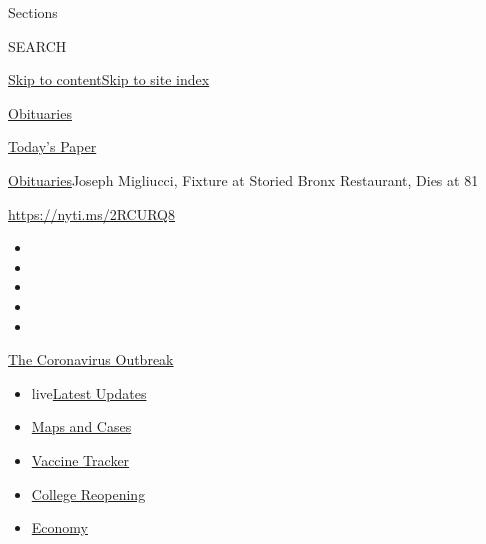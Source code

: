 Sections

SEARCH

\protect\hyperlink{site-content}{Skip to
content}\protect\hyperlink{site-index}{Skip to site index}

\href{https://www.nytimes3xbfgragh.onion/section/obituaries}{Obituaries}

\href{https://myaccount.nytimes3xbfgragh.onion/auth/login?response_type=cookie\&client_id=vi}{}

\href{https://www.nytimes3xbfgragh.onion/section/todayspaper}{Today's
Paper}

\href{/section/obituaries}{Obituaries}\textbar{}Joseph Migliucci,
Fixture at Storied Bronx Restaurant, Dies at 81

\url{https://nyti.ms/2RCURQ8}

\begin{itemize}
\item
\item
\item
\item
\item
\end{itemize}

\href{https://www.nytimes3xbfgragh.onion/news-event/coronavirus?action=click\&pgtype=Article\&state=default\&region=TOP_BANNER\&context=storylines_menu}{The
Coronavirus Outbreak}

\begin{itemize}
\tightlist
\item
  live\href{https://www.nytimes3xbfgragh.onion/2020/08/04/world/coronavirus-covid-19.html?action=click\&pgtype=Article\&state=default\&region=TOP_BANNER\&context=storylines_menu}{Latest
  Updates}
\item
  \href{https://www.nytimes3xbfgragh.onion/interactive/2020/us/coronavirus-us-cases.html?action=click\&pgtype=Article\&state=default\&region=TOP_BANNER\&context=storylines_menu}{Maps
  and Cases}
\item
  \href{https://www.nytimes3xbfgragh.onion/interactive/2020/science/coronavirus-vaccine-tracker.html?action=click\&pgtype=Article\&state=default\&region=TOP_BANNER\&context=storylines_menu}{Vaccine
  Tracker}
\item
  \href{https://www.nytimes3xbfgragh.onion/2020/08/02/us/covid-college-reopening.html?action=click\&pgtype=Article\&state=default\&region=TOP_BANNER\&context=storylines_menu}{College
  Reopening}
\item
  \href{https://www.nytimes3xbfgragh.onion/live/2020/08/03/business/stock-market-today-coronavirus?action=click\&pgtype=Article\&state=default\&region=TOP_BANNER\&context=storylines_menu}{Economy}
\end{itemize}

